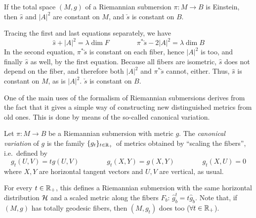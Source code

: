 \begin{cor}
	If the total space $(M,g)$ of a Riemannian submersion $\pi:M\to B$ is Einstein, then $\hat s$ and $\lvert A\rvert^2$ are constant on $M$, and $\check s$ is constant on $B$.
\end{cor}
\begin{myproof}
	Tracing the first and last equations separately, we have 
	\begin{equation*}
		\hat s+\lvert A\rvert^2=\lambda \dim F\qquad\qquad 
		\pi^*\check s-2\lvert A\rvert^2=\lambda\dim B
	\end{equation*} 
	In the second equation, $\pi^*\check s$ is constant on each fiber, hence $\lvert A\rvert^2$ is too, and finally $\hat s$ as well, by the first equation. Because all fibers are isometric, $\hat s$ does not depend on the fiber, and therefore both $\lvert A \rvert^2$ and $\pi^*\check s$ cannot, either. Thus, $\hat s$ is constant on $M$, as is $\lvert A\rvert^2$. $\check s$ is constant on $B$.
\end{myproof}

One of the main uses of the formalism of Riemannian submersions derives from the fact that it gives a simple way of constructing new distinguished metrics from old ones. This is done by means of the so-called canonical variation.

\begin{mydef}
	Let $\pi:M\to B$ be a Riemannian submersion with metric $g$. The \emph{canonical variation} of $g$ is the family $\{g_t\}_{t\in \mathbb{R}_+}$ of metrics obtained by ``scaling the fibers'', i.e.~defined by
	\begin{equation*}
		g_t(U,V)=tg(U,V)\qquad \qquad g_t(X,Y)=g(X,Y)\qquad \qquad g_t(X,U)=0
	\end{equation*}
	where $X,Y$ are horizontal tangent vectors and $U,V$ are vertical, as usual.
\end{mydef}

For every $t\in\mathbb{R}_+$, this defines a Riemannian submersion with the same horizontal distribution $\mathcal{H}$ and a scaled metric along the fibers $F_b$: $\hat g^t_b=t\hat g_b$. Note that, if $(M,g)$ has totally geodesic fibers, then $(M,g_t)$ does too ($\forall t\in \mathbb{R}_+$). 

